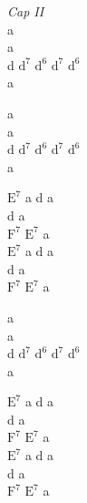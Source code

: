 \begin{chordw}
    \textit{Cap II}\\
    a\\
    a\\
    d $\mathrm{d^{7}}$ $\mathrm{d^{6}}$ $\mathrm{d^{7}}$ $\mathrm{d^{6}}$\\
    a

    a\\
    a\\
    d $\mathrm{d^{7}}$ $\mathrm{d^{6}}$ $\mathrm{d^{7}}$ $\mathrm{d^{6}}$\\
    a

    $\mathrm{E^{7}}$ a d a\\
    d a\\
    $\mathrm{F^{7}}$ $\mathrm{E^{7}}$ a\\
    $\mathrm{E^{7}}$ a d a\\
    d a\\
    $\mathrm{F^{7}}$ $\mathrm{E^{7}}$ a

    a\\
    a\\
    d $\mathrm{d^{7}}$ $\mathrm{d^{6}}$ $\mathrm{d^{7}}$ $\mathrm{d^{6}}$\\
    a

    $\mathrm{E^{7}}$ a d a\\
    d a\\
    $\mathrm{F^{7}}$ $\mathrm{E^{7}}$ a\\
    $\mathrm{E^{7}}$ a d a\\
    d a\\
    $\mathrm{F^{7}}$ $\mathrm{E^{7}}$ a
\end{chordw}
